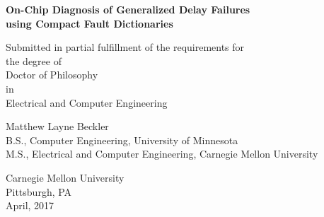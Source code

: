 \begin{titlepage}
\begin{center}

\singlespacing

\vspace*{1.0in}

{\large \bf On-Chip Diagnosis of Generalized Delay Failures\\using Compact Fault Dictionaries}

\vspace{1in}

{\doublespacing
Submitted in partial fulfillment of the requirements for \\
the degree of \\
Doctor of Philosophy \\
in \\
Electrical and Computer Engineering }

\vspace{1.3in}

Matthew Layne Beckler
\\[\baselineskip]
B.S., Computer Engineering, University of Minnesota\\
M.S., Electrical and Computer Engineering, Carnegie Mellon University

\vspace{1.8in}

Carnegie Mellon University \\
Pittsburgh, PA
\\[\baselineskip]
April, 2017

\vfill
\end{center}
\end{titlepage}
\raggedbottom



